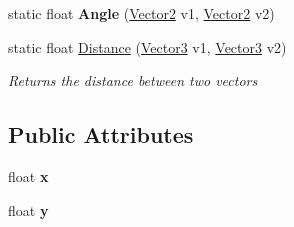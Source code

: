 \begin{DoxyCompactItemize}
\item 
\hypertarget{struct_engine_1_1_vector2_acae4c867ab8e5a6b94480a8bfcb016ac}{static float {\bfseries Angle} (\hyperlink{struct_engine_1_1_vector2}{Vector2} v1, \hyperlink{struct_engine_1_1_vector2}{Vector2} v2)}\label{struct_engine_1_1_vector2_acae4c867ab8e5a6b94480a8bfcb016ac}

\item 
static float \hyperlink{struct_engine_1_1_vector2_a89e3b2a8010283189b9d25b28bb9d522}{Distance} (\hyperlink{struct_engine_1_1_vector3}{Vector3} v1, \hyperlink{struct_engine_1_1_vector3}{Vector3} v2)
\begin{DoxyCompactList}\small\item\em Returns the distance between two vectors \end{DoxyCompactList}\end{DoxyCompactItemize}
\subsection*{Public Attributes}
\begin{DoxyCompactItemize}
\item 
\hypertarget{struct_engine_1_1_vector2_a2a9f78f3c84a550d0509f41019a37157}{float {\bfseries x}}\label{struct_engine_1_1_vector2_a2a9f78f3c84a550d0509f41019a37157}

\item 
\hypertarget{struct_engine_1_1_vector2_adcc4b0c8d3065e4cb30df937c1ba348d}{float {\bfseries y}}\label{struct_engine_1_1_vector2_adcc4b0c8d3065e4cb30df937c1ba348d}

\end{DoxyCompactItemize}
